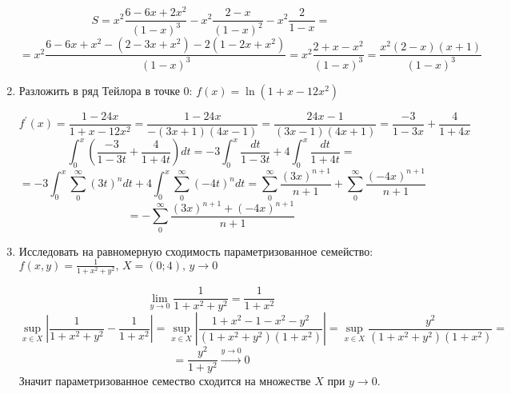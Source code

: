 \documentclass{article}
\begin{document}
\begin{large}
\begin{enumerate}
$$ S = x^2\frac{6-6x+2x^2}{(1-x)^3} - x^2\frac{2-x}{(1-x)^2} - x^2\frac{2}{1-x} = $$
$$ = x^2\frac{6-6x+x^2 - (2-3x+x^2) - 2(1-2x+x^2)}{(1-x)^3} = x^2\frac{2+x-x^2}{(1-x)^3} = \frac{x^2(2-x)(x+1)}{(1-x)^3} $$

\item Разложить в ряд Тейлора в точке 0: $f(x) = \ln(1+x-12x^2)$

$$ f^{'}(x) = \frac{1-24x}{1+x-12x^2} = \frac{1-24x}{-(3x+1)(4x-1)} = \frac{24x-1}{(3x-1)(4x+1)} = \frac{-3}{1-3x}+\frac{4}{1+4x}$$
$$ \int_{0}^{x} \left( \frac{-3}{1-3t}+\frac{4}{1+4t} \right) dt = -3 \int_{0}^{x} \frac{dt}{1-3t} + 4 \int_{0}^{x} \frac{dt}{1+4t} = $$
$$ = -3 \int_{0}^{x} \sum_{0}^{\infty} (3t)^n dt + 4 \int_{0}^{x} \sum_{0}^{\infty} (-4t)^n dt = \sum_{0}^{\infty} \frac{(3x)^{n+1}}{n+1} + \sum_{0}^{\infty} \frac{(-4x)^{n+1}}{n+1} $$
$$ = -\sum_{0}^{\infty} \frac{(3x)^{n+1} + (-4x)^{n+1}}{n+1} $$

\item Исследовать на равномерную сходимость параметризованное семейство: \\ $f(x,y) = \frac{1}{1+x^2+y^2}, \, X = (0;4), \, y \to 0 $

$$ \lim_{y \to 0} \frac{1}{1+x^2+y^2} = \frac{1}{1 + x^2} $$
$$ \sup_{x \in X} \left| \frac{1}{1+x^2+y^2} - \frac{1}{1 + x^2} \right| = \sup_{x \in X} \left| \frac{1+x^2 - 1 - x^2-y^2}{(1+x^2+y^2)(1+x^2)}  \right| = \sup_{x \in X} \frac{y^2}{(1+x^2+y^2)(1+x^2)} = $$
$$ = \frac{y^2}{1+y^2} \xrightarrow{y \to 0} 0 $$
Значит параметризованное семество сходится на множестве $X$ при $y \to 0$.


\end{enumerate}
\end{large}
\end{document}
